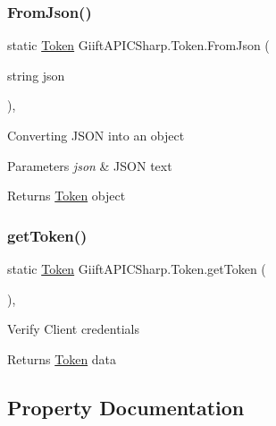 \subsubsection{\texorpdfstring{From\+Json()}{FromJson()}}
{\footnotesize\ttfamily static \hyperlink{class_giift_a_p_i_c_sharp_1_1_token}{Token} Giift\+A\+P\+I\+C\+Sharp.\+Token.\+From\+Json (\begin{DoxyParamCaption}\item[{string}]{json }\end{DoxyParamCaption})\hspace{0.3cm}{\ttfamily [inline]}, {\ttfamily [static]}}



Converting J\+S\+ON into an object 


\begin{DoxyParams}{Parameters}
{\em json} & J\+S\+ON text\\
\hline
\end{DoxyParams}
\begin{DoxyReturn}{Returns}
\hyperlink{class_giift_a_p_i_c_sharp_1_1_token}{Token} object
\end{DoxyReturn}
\mbox{\label{class_giift_a_p_i_c_sharp_1_1_token_a6e8bfdf7b965d3e26908e3cfb980c909}} 
\subsubsection{\texorpdfstring{get\+Token()}{getToken()}}
{\footnotesize\ttfamily static \hyperlink{class_giift_a_p_i_c_sharp_1_1_token}{Token} Giift\+A\+P\+I\+C\+Sharp.\+Token.\+get\+Token (\begin{DoxyParamCaption}{ }\end{DoxyParamCaption})\hspace{0.3cm}{\ttfamily [inline]}, {\ttfamily [static]}}



Verify Client credentials 

\begin{DoxyReturn}{Returns}
\hyperlink{class_giift_a_p_i_c_sharp_1_1_token}{Token} data
\end{DoxyReturn}


\subsection{Property Documentation}
\mbox{\label{class_giift_a_p_i_c_sharp_1_1_token_aefecf4cb88e85c1dc1a56206ac34f794}} 
